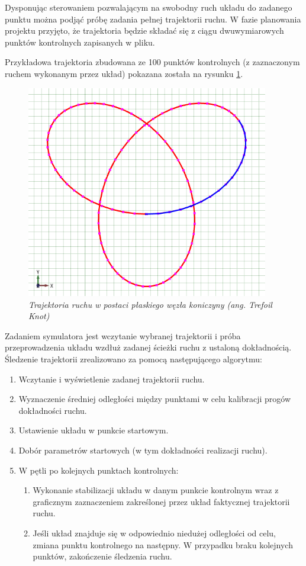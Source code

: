 \documentclass[12pt, twoside, openany]{report}
\theoremstyle{definition}
\begin{document}
Dysponując sterowaniem pozwalającym na swobodny ruch układu do zadanego punktu można podjąć próbę zadania pełnej trajektorii ruchu. W fazie planowania projektu przyjęto, że trajektoria będzie składać się z ciągu dwuwymiarowych punktów kontrolnych zapisanych w pliku.

Przykładowa trajektoria zbudowana ze 100 punktów kontrolnych (z zaznaczonym ruchem wykonanym przez układ) pokazana została na rysunku \ref{TrajectoryTrefoilKnot}.

\begin{figure}[H]
	\centering
		\includegraphics[width = 300pt]{TrajectoryTrefoilKnot} 
		\caption{\textit{Trajektoria ruchu w postaci płaskiego węzła koniczyny (ang. Trefoil Knot)}}
		\label{TrajectoryTrefoilKnot}
\end{figure}

Zadaniem symulatora jest wczytanie wybranej trajektorii i próba przeprowadzenia układu wzdłuż zadanej ścieżki ruchu z ustaloną dokładnością. Śledzenie trajektorii zrealizowano za pomocą następującego algorytmu:
\begin{enumerate}
\item Wczytanie i wyświetlenie zadanej trajektorii ruchu.
\item Wyznaczenie średniej odległości między punktami w celu kalibracji progów dokładności ruchu.
\item Ustawienie układu w punkcie startowym.
\item Dobór parametrów startowych (w tym dokładności realizacji ruchu).
\item W pętli po kolejnych punktach kontrolnych:
\begin{enumerate}
\item Wykonanie stabilizacji układu w danym punkcie kontrolnym wraz z graficznym zaznaczeniem zakreślonej przez układ faktycznej trajektorii ruchu.
\item Jeśli układ znajduje się w odpowiednio niedużej odległości od celu, zmiana punktu kontrolnego na następny.
W przypadku braku kolejnych punktów, zakończenie śledzenia ruchu. 
\end{enumerate}
\end{enumerate}
\end{document}
